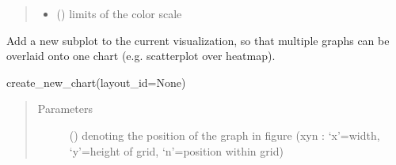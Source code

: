 \documentclass[letterpaper,10pt,english,openany,oneside]{sphinxmanual}
\begin{document}
\begin{fulllineitems}
\begin{fulllineitems}
\begin{quote}
\begin{description}
\begin{itemize}
\item {} 
 (\sphinxstyleliteralemphasis{\sphinxupquote{{[}}}\sphinxstyleliteralemphasis{\sphinxupquote{{]} }}\sphinxstyleliteralemphasis{\sphinxupquote{, }}\sphinxstyleliteralemphasis{\sphinxupquote{, }}\sphinxstyleliteralemphasis{\sphinxupquote{(}}\sphinxstyleliteralemphasis{\sphinxupquote{,}}\sphinxstyleliteralemphasis{\sphinxupquote{)}}) \textendash{} limits of the color scale

\end{itemize}

\end{description}\end{quote}

\end{fulllineitems}


\begin{fulllineitems}
\label{\detokenize{pygpc:pygpc.vis.Visualization.create_new_chart}}
Add a new subplot to the current visualization, so that multiple graphs can be overlaid onto one chart
(e.g. scatterplot over heatmap).

create\_new\_chart(layout\_id=None)
\begin{quote}\begin{description}
\item[{Parameters}] \leavevmode
{} (\sphinxstyleliteralemphasis{\sphinxupquote{(}}\sphinxstyleliteralemphasis{\sphinxupquote{) }}\sphinxstyleliteralemphasis{\sphinxupquote{, }}\sphinxstyleliteralemphasis{\sphinxupquote{, }}) \textendash{} denoting the position of the graph in figure (xyn : ‘x’=width, ‘y’=height of grid, ‘n’=position within grid)

\end{description}\end{quote}


\end{fulllineitems}
\end{fulllineitems}
\end{document}
